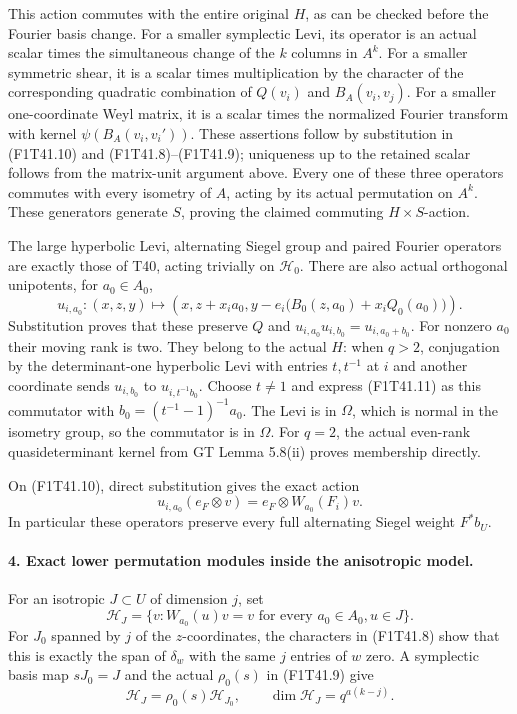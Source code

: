 This action commutes with the entire original \(H\),
as can be checked before the Fourier basis change.
For a smaller symplectic Levi, its operator is an actual
scalar times the simultaneous change of the \(k\)
columns in \(A^k\). For a smaller symmetric shear,
it is a scalar times multiplication by the character
of the corresponding quadratic combination of
\(Q(v_i)\) and \(B_A(v_i,v_j)\).
For a smaller one-coordinate Weyl matrix, it is a
scalar times the normalized Fourier transform with
kernel \(\psi(B_A(v_i,v_i'))\).
These assertions follow by substitution in (F1T41.10)
and (F1T41.8)--(F1T41.9); uniqueness up to the retained
scalar follows from the matrix-unit argument above.
Every one of these three operators commutes with every
isometry of \(A\), acting by its actual permutation
on \(A^k\). These generators generate \(S\), proving
the claimed commuting \(H\times S\)-action.

The large hyperbolic Levi, alternating Siegel group
and paired Fourier operators are exactly those of
T40, acting trivially on \(\mathcal H_0\). There are
also actual orthogonal unipotents, for \(a_0\in A_0\),
\[
 u_{i,a_0}:(x,z,y)\longmapsto
 \left(x,z+x_i a_0,
 y-e_i\bigl(B_0(z,a_0)+x_iQ_0(a_0)\bigr)\right).
 \tag{F1T41.11}
\]
Substitution proves that these preserve \(Q\) and
\(u_{i,a_0}u_{i,b_0}=u_{i,a_0+b_0}\).
For nonzero \(a_0\) their moving rank is two.
They belong to the actual \(H\): when \(q>2\),
conjugation by the determinant-one hyperbolic Levi
with entries \(t,t^{-1}\) at \(i\) and another
coordinate sends \(u_{i,b_0}\) to \(u_{i,t^{-1}b_0}\).
Choose \(t\ne1\) and express (F1T41.11) as this
commutator with \(b_0=(t^{-1}-1)^{-1}a_0\).
The Levi is in \(\Omega\), which is normal in the
isometry group, so the commutator is in \(\Omega\).
For \(q=2\), the actual even-rank quasideterminant
kernel from GT Lemma 5.8(ii) proves membership directly.

On (F1T41.10), direct substitution gives the exact action
\[
          u_{i,a_0}(e_F\otimes v)
                  =e_F\otimes W_{a_0}(F_i)v.
 \tag{F1T41.12}
\]
In particular these operators preserve every full
alternating Siegel weight \(F^*b_U\).

\paragraph{4. Exact lower permutation modules inside the anisotropic model.}
For an isotropic \(J\subset U\) of dimension \(j\), set
\[
 \mathcal H_J=
 \{v:W_{a_0}(u)v=v\text{ for every }a_0\in A_0, u\in J\}.
 \tag{F1T41.13}
\]
For \(J_0\) spanned by \(j\) of the \(z\)-coordinates,
the characters in (F1T41.8) show that this is exactly
the span of \(\delta_w\) with the same \(j\) entries
of \(w\) zero. A symplectic basis map \(sJ_0=J\)
and the actual \(\rho_0(s)\) in (F1T41.9) give
\[
       \mathcal H_J=\rho_0(s)\mathcal H_{J_0},
                    \qquad\dim\mathcal H_J=q^{a(k-j)}.
 \tag{F1T41.14}
\]


